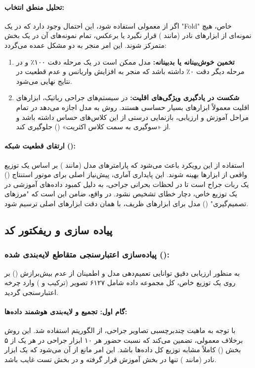 \documentclass{article}
\begin{document}
\paragraph{تحلیل منطق انتخاب:}
اگر از  معمولی استفاده شود، این احتمال وجود دارد که در یک "Fold" خاص، هیچ نمونه‌ای از ابزارهای نادر (مانند ) قرار نگیرد یا برعکس، تمام نمونه‌های آن در یک بخش متمرکز شوند. این امر منجر به دو مشکل عمده می‌گردد:
\begin{enumerate}
	\item \textbf{تخمین خوش‌بینانه یا بدبینانه:} مدل ممکن است در یک مرحله دقت ۱۰۰٪ و در مرحله دیگر دقت ۰٪ داشته باشد که منجر به افزایش واریانس و عدم قطعیت در نتایج نهایی می‌شود.
	\item \textbf{شکست در یادگیری ویژگی‌های اقلیت:} در سیستم‌های جراحی رباتیک، ابزارهای اقلیت معمولاً ابزارهای بسیار حساسی هستند. روش  به مدل اجازه می‌دهد در تمام مراحل آموزش و ارزیابی، بازنمایی درستی از این کلاس‌های حساس داشته باشد و از «سوگیری به سمت کلاس اکثریت» () جلوگیری کند.
\end{enumerate}

\paragraph{ارتقای قطعیت شبکه ():}
استفاده از این رویکرد باعث می‌شود که پارامترهای مدل (مانند ) بر اساس یک توزیع واقعی از ابزارها بهینه شوند. این پایداری آماری، پیش‌نیاز اصلی برای موتور استنتاج () یک ربات جراح است تا در لحظات بحرانی جراحی، به دلیل کمبود داده‌های آموزشی در یک توزیع خاص، دچار خطای تشخیص نشود. در واقع،  ضامن این است که "مرزهای تصمیم‌گیری" () مدل برای ابزارهای ظریف، با همان دقت ابزارهای اصلی ترسیم شود.
\subsection{پیاده سازی و ریفکتور کد}
\subsubsection{پیاده‌سازی اعتبارسنجی متقاطع لایه‌بندی شده ():}

به منظور ارزیابی دقیق توانایی تعمیم‌دهی مدل و اطمینان از عدم بیش‌برازش () بر روی یک توزیع خاص، کل مجموعه داده شامل ۶۱۲۷ تصویر (ترکیب  و ) وارد چرخه اعتبارسنجی گردید.

\paragraph{گام اول: تجمیع و لایه‌بندی هوشمند داده‌ها:}
با توجه به ماهیت چندبرچسبی تصاویر جراحی، از الگوریتم  استفاده شد. این روش برخلاف  معمولی، تضمین می‌کند که نسبت حضور هر ۱۰ ابزار جراحی در هر یک از ۵ بخش () کاملاً مشابه توزیع کل داده‌ها باشد. این امر مانع از آن می‌شود که یک ابزار نادر (مانند ) تنها در بخش آموزش قرار گرفته و در بخش تست غایب باشد.
\end{document}
